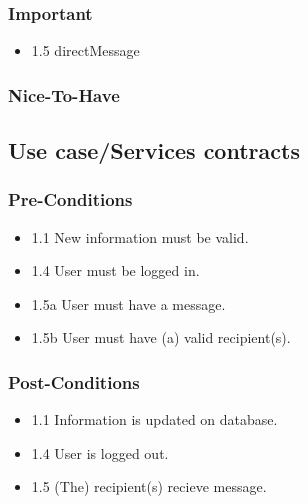 \documentclass[hidelinks, 12pt, oneside]{article}
\begin{document}
\subsubsection{Important}
\begin{itemize}
  \item 1.5 directMessage
\end{itemize}
\subsubsection{Nice-To-Have}


\subsection{Use case/Services contracts}
\subsubsection{Pre-Conditions}								%
\begin{itemize}
  \item 1.1 New information must be valid.
  \item 1.4 User must be logged in.
  \item 1.5a User must have a message.
  \item 1.5b User must have (a) valid recipient(s).
\end{itemize}

\subsubsection{Post-Conditions}%
\begin{itemize}
  \item 1.1 Information is updated on database.
  \item 1.4 User is logged out.
  \item 1.5 (The) recipient(s) recieve message.
\end{itemize}
\end{document}
